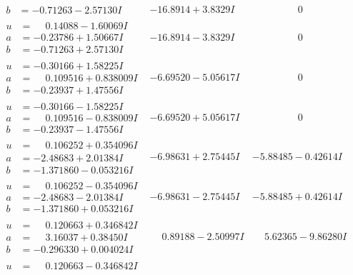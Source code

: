 \documentclass[1p]{elsarticle_modified}
\theoremstyle{definition}
\begin{document}
$$\begin{array}{c|c|c}
\begin{aligned}
b &= -0.71263 - 2.57130 I\end{aligned}
 & -16.8914 + 3.8329 I & \phantom{-0.000000 } 0 \\ \hline\begin{aligned}
u &= \phantom{-}0.14088 - 1.60069 I \\
a &= -0.23786 + 1.50667 I \\
b &= -0.71263 + 2.57130 I\end{aligned}
 & -16.8914 - 3.8329 I & \phantom{-0.000000 } 0 \\ \hline\begin{aligned}
u &= -0.30166 + 1.58225 I \\
a &= \phantom{-}0.109516 + 0.838009 I \\
b &= -0.23937 + 1.47556 I\end{aligned}
 & -6.69520 - 5.05617 I & \phantom{-0.000000 } 0 \\ \hline\begin{aligned}
u &= -0.30166 - 1.58225 I \\
a &= \phantom{-}0.109516 - 0.838009 I \\
b &= -0.23937 - 1.47556 I\end{aligned}
 & -6.69520 + 5.05617 I & \phantom{-0.000000 } 0 \\ \hline\begin{aligned}
u &= \phantom{-}0.106252 + 0.354096 I \\
a &= -2.48683 + 2.01384 I \\
b &= -1.371860 - 0.053216 I\end{aligned}
 & -6.98631 + 2.75445 I & -5.88485 - 0.42614 I \\ \hline\begin{aligned}
u &= \phantom{-}0.106252 - 0.354096 I \\
a &= -2.48683 - 2.01384 I \\
b &= -1.371860 + 0.053216 I\end{aligned}
 & -6.98631 - 2.75445 I & -5.88485 + 0.42614 I \\ \hline\begin{aligned}
u &= \phantom{-}0.120663 + 0.346842 I \\
a &= \phantom{-}3.16037 + 0.38450 I \\
b &= -0.296330 + 0.004024 I\end{aligned}
 & \phantom{-}0.89188 - 2.50997 I & \phantom{-}5.62365 - 9.86280 I \\ \hline\begin{aligned}
u &= \phantom{-}0.120663 - 0.346842 I \\

\end{aligned}
\end{array}$$
\end{document}
